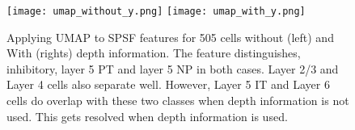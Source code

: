 \documentclass[runningheads]{llncs}
\begin{document}
\begin{figure}[ht]
    \centering
    \texttt{[image: umap\_without\_y.png]}
    \texttt{[image: umap\_with\_y.png]}
    \caption{Applying UMAP to SPSF features for 505 cells without (left)  and With (rights) depth information. The feature distinguishes, inhibitory, layer 5 PT and layer 5 NP in both cases. Layer 2/3 and Layer 4 cells also separate well. However, Layer 5 IT and Layer 6 cells do overlap with these two classes when depth information is not used. This gets resolved when depth information is used.}
    \label{fig:resclustering}
\end{figure}
\end{document}
